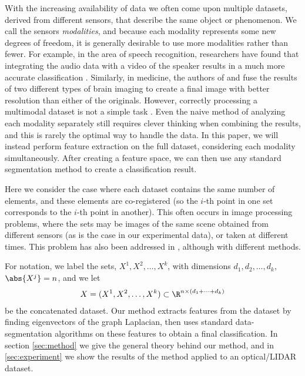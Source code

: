 \documentclass{article}
\begin{document}
With the increasing availability of data we often come upon multiple datasets,
derived from different sensors, that describe the same object or phenomenon. We
call the sensors \emph{modalities}, and because each modality represents some
new degrees of freedom, it is generally desirable to use more modalities rather
than fewer. For example, in the area of speech recognition, researchers have
found that integrating the audio data with a video of the speaker results in a
much more accurate classification \cite{Potamianos03,
  sedighin:hal-01400542}. Similarly, in medicine, the authors of \cite{Lei12}
and \cite{Samadi2016} fuse the results of two different types of brain imaging
to create a final image with better resolution than either of the
originals. However, correctly processing a multimodal dataset is not a simple
task \cite{lahat:hal-01062366}. Even the naive method of analyzing each modality
separately still requires clever thinking when combining the results, and this
is rarely the optimal way to handle the data. In this paper, we will instead
perform feature extraction on the full dataset, considering each modality
simultaneously. After creating a feature space, we can then use any standard
segmentation method to create a classification result.

Here we consider the case where each dataset contains the same number of
elements, and these elements are co-registered (so the $i$-th point in one set
corresponds to the $i$-th point in another). This often occurs in image
processing problems, where the sets may be images of the same scene obtained
from different sensors (as is the case in our experimental data), or taken at
different times. This problem has also been addressed in \cite{Tochon2015,
  Ali08}, although with different methods.

For notation, we label the sets, $X^1,X^2,\ldots,X^k$, with dimensions
$d_1,d_2,\ldots,d_k$, $\abs{X^j}=n$, and we let
\begin{align}X = (X^1,X^2,\ldots,X^k)\subset \R^{n\times (d_1+\cdots+d_k)}\end{align} be the
concatenated dataset. Our method extracts features from the dataset by finding
eigenvectors of the graph Laplacian, then uses standard data-segmentation
algorithms on these features to obtain a final classification.  In section
\ref{sec:method} we give the general theory behind our method, and in
\ref{sec:experiment} we show the results of the method applied to an
optical/LIDAR dataset.
\end{document}
